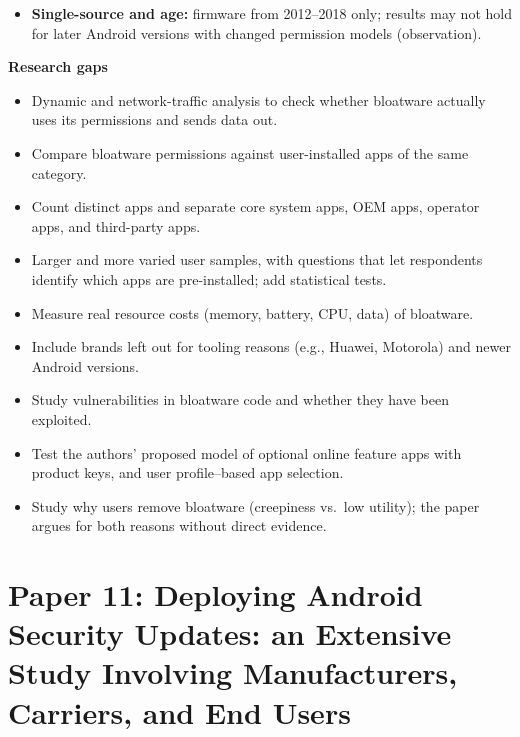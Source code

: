 \documentclass[11pt,a4paper]{article}
\begin{document}
\begin{enumerate}
\begin{itemize}[leftmargin=*, itemsep=1pt, topsep=2pt]
\begin{itemize}[itemsep=0pt]
            \item Data uploads to servers: stated as ability, not observed.
            \item No vendor response or disclosure reported (Not Specified).
        \end{itemize}
        \item \textbf{Single-source and age:} firmware from 2012--2018 only; results may not hold for later Android versions with changed permission models (observation).
    \end{itemize}

    \vspace{4pt}
    \textbf{Research gaps}
    \begin{itemize}[leftmargin=*, itemsep=1pt, topsep=2pt]
        \item Dynamic and network-traffic analysis to check whether bloatware actually uses its permissions and sends data out.
        \item Compare bloatware permissions against user-installed apps of the same category.
        \item Count distinct apps and separate core system apps, OEM apps, operator apps, and third-party apps.
        \item Larger and more varied user samples, with questions that let respondents identify which apps are pre-installed; add statistical tests.
        \item Measure real resource costs (memory, battery, CPU, data) of bloatware.
        \item Include brands left out for tooling reasons (e.g., Huawei, Motorola) and newer Android versions.
        \item Study vulnerabilities in bloatware code and whether they have been exploited.
        \item Test the authors' proposed model of optional online feature apps with product keys, and user profile--based app selection.
        \item Study why users remove bloatware (creepiness vs.\ low utility); the paper argues for both reasons without direct evidence.
    \end{itemize}

\end{enumerate}

\newpage

\section{Paper 11: Deploying Android Security Updates: an Extensive Study Involving Manufacturers, Carriers, and End Users}
\end{document}
